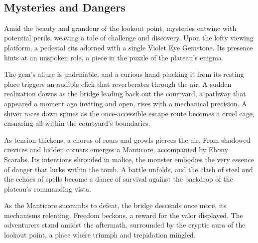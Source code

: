 \vfill\eject\hfill\\\vspace*{0.5\fontdimen6\font}
\subsection*{Mysteries and Dangers}
{\entryfont
	Amid the beauty and grandeur of the lookout point, mysteries entwine with potential perils, weaving a tale of challenge and discovery. Upon the lofty viewing platform, a pedestal sits adorned with a single Violet Eye Gemstone. Its presence hints at an unspoken role, a piece in the puzzle of the plateau's enigma.
	
	The gem's allure is undeniable, and a curious hand plucking it from its resting place triggers an audible click that reverberates through the air. A sudden realization dawns as the bridge leading back out the courtyard, a pathway that appeared a moment ago inviting and open, rises with a mechanical precision. A shiver races down spines as the once-accessible escape route becomes a cruel cage, ensnaring all within the courtyard's boundaries.
	
	As tension thickens, a chorus of roars and growls pierces the air. From shadowed crevices and hidden corners emerges a Manticore, accompanied by  Ebony Scarabs. Its intentions shrouded in malice, the monster embodies the very essence of danger that lurks within the tomb. A battle unfolds, and the clash of steel and the echoes of spells become a dance of survival against the backdrop of the plateau's commanding vista.
	
	 As the Manticore succumbs to defeat, the bridge descends once more, its mechanisms relenting. Freedom beckons, a reward for the valor displayed. The adventurers stand amidst the aftermath, surrounded by the cryptic aura of the lookout point, a place where triumph and trepidation mingled.
}